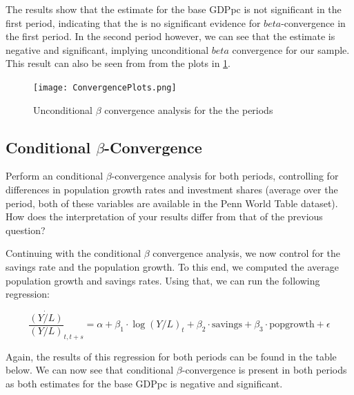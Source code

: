 \documentclass[a4paper,11pt]{article}
\begin{document}
The results show that the estimate for the base GDPpc is not significant in the first period, indicating that the is no significant evidence for $beta$-convergence in the first period. In the second period however, we can see that the estimate is negative and significant, implying unconditional $beta$ convergence for our sample. This result can also be seen from from the plots in \ref{fig:uncond}.  

\pagebreak
\vfill
\begin{figure}[H]
    \centering
    \texttt{[image: ConvergencePlots.png]}
    \caption{Unconditional $\beta$ convergence analysis for the the periods}
    \label{fig:uncond}
\end{figure}
\vfill
\pagebreak

\begin{qbox}{\subsection{Conditional $\beta$-Convergence}}
Perform an conditional $\beta$-convergence analysis for both periods, controlling for differences in population growth rates and investment shares (average over the period, both of these variables are available in the Penn World Table dataset). How does the interpretation of  your results differ from that of the previous question?
\end{qbox}

Continuing with the conditional $\beta$ convergence analysis, we now control for the savings rate and the population growth. To this end, we computed the average population growth and savings rates. Using that, we can run the following regression:

$$\frac{\dot{\left(Y/L \right)}}{\left(Y/L \right)}_{t,t+s} = \alpha + \beta_1\cdot \log(Y/L)_{t} + \beta_2\cdot \text{savings} + \beta_3\cdot \text{popgrowth} + \epsilon$$

Again, the results of this regression for both periods can be found in the table below. We can now see that conditional $\beta$-convergence is present in both periods as both estimates for the base GDPpc is negative and significant. 
\end{document}
